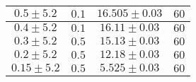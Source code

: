 \documentclass[@MAIN@]{subfile}
\begin{document}
\begin{tabular}{ ||c|c|c|c|| }
        \hline
        $0.5\pm 5.2$      & $0.1$       & $16.505\pm 0.03$  & $60$     \\
        \hline
        $0.4\pm 5.2$      & $0.1$       & $16.11\pm 0.03$   & $60$     \\
        \hline
        $0.3\pm 5.2$      & $0.5$       & $15.13\pm 0.03$   & $60$     \\
        \hline
        $0.2\pm 5.2$      & $0.5$       & $12.18\pm 0.03$   & $60$     \\
        \hline
        $0.15\pm 5.2$     & $0.5$       & $5.525\pm 0.03$   & $60$     \\
        \hline

    \end{tabular}
\end{document}
